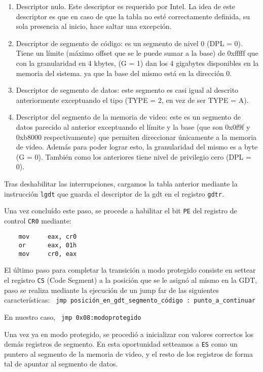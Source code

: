 \begin{enumerate}
\item Descriptor nulo. Este descriptor es requerido por Intel. La idea de este descriptor es que en caso de que la tabla no esté correctamente definida, su sola presencia al inicio, hace saltar una excepción. %

\item Descriptor de segmento de código: es un segmento de nivel 0 (DPL = 0). Tiene un límite (máximo offset que se le puede sumar a la base) de 0xfffff que con la granularidad en 4 kbytes, (G = 1) dan los 4 gigabytes disponibles en la memoria del sistema. ya que la base del mismo está en la dirección 0.

\item Descriptor de segmento de datos: este segmento es casi igual al descrito anteriormente exceptuando el tipo (TYPE = 2, en vez de ser TYPE = A).

\item Descriptor del segmento de la memoria de video: este es un segmento de datos parecido al anterior exceptuando el límite y la base (que son 0x0f9f y 0xb8000 respectivamente) que permiten direccionar únicamente a la memoria de video. Además para poder lograr esto, la granularidad del mismo es a byte (G = 0). También como los anteriores tiene nivel de privilegio cero (DPL = 0).
\end{enumerate}

Tras deshabilitar las interrupciones, cargamos la tabla anterior mediante la instrucción \texttt{lgdt} que guarda el descriptor de la gdt en el registro \texttt{gdtr}.

Una vez concluído este paso, se procede a habilitar el bit \texttt{PE} del registro de control \texttt{CR0} mediante:

\begin{verbatim}
	mov     eax, cr0
	or      eax, 01h
	mov     cr0, eax
\end{verbatim}

El último paso para completar la transición a modo protegido consiste en settear el registro \texttt{CS} (Code Segment) a la posición que se le asignó al mismo en la GDT, paso se realiza mediante la ejecución de un jump far de las siguientes características: 
\verb= jmp posición_en_gdt_segmento_código : punto_a_continuar=

En nuestro caso, 
\verb= jmp 0x08:modoprotegido =

Una vez ya en modo protegido, se procedió a inicializar con valores correctos los demás registros de segmento. En esta oportunidad setteamos a \texttt{ES} como un puntero al segmento de la memoria de video, y el resto de los registros de forma tal de apuntar al segmento de datos. 

